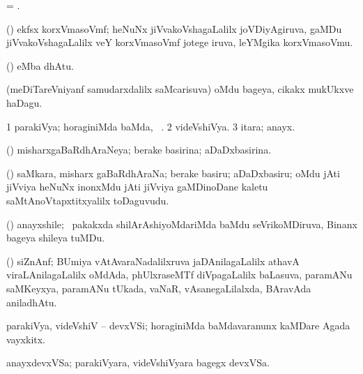 \bentry
{} 
\gl{\nA}
\bmng
= .
\emng
\eentry


\bentry
{} 
\gl{\nA} 
\bmng
(\jiVvi) ekfsx korxVmasoVmf; heNuNx jiVvakoVshagaLalilx joVDiyAgiruva, gaMDu jiVvakoVshagaLalilx veY  korxVmasoVmf jotege iruva, leYMgika korxVmasoVmu.
\emng  
\eentry

\bentry
{} 
\gl{\saMkiSx}
\bmng
{}
\emng
\eentry

\bentry
{}
\gl{\saMkeV}
\bmng
(\ravi)  eMba dhAtu.
\emng
\eentry

\bentry
{} 
\gl{\nA} 
\bmng
(meDiTareVniyanf samudarxdalilx saMcarisuva) oMdu bageya, cikakx mukUkxve haDagu. \quad {}
\emng
\eentry

\bentry
{} 
\gl{\sapUpa} 
\bmng
\bnum
\num{1} parakiVya; horaginiMda baMda, \udA\ .  
\num{2} videVshiVya. 
\num{3} itara; anayx.
\enum
\emng
\eentry

\bentry
{} 
\gl{\gu} 
\bmng
(\jiVvi) misharxgaBaRdhAraNeya; berake basirina; aDaDxbasirina.
\emng
\eentry

\bentry
{} 
\gl{\nA} 
\bmng
(\jiVvi) saMkara, misharx gaBaRdhAraNa; berake basiru; aDaDxbasiru; oMdu jAti jiVviya heNuNx inonxMdu jAti jiVviya gaMDinoDane kaletu saMtAnoVtapxtitxyalilx toDaguvudu.
\emng
\eentry

\bentry
{} 
\gl{\nA} 
\bmng
(\BUvi) anayxshile; \sA\ pakakxda shilArAshiyoMdariMda baMdu  seVrikoMDiruva, Binanx bageya shileya tuMDu.
\emng 
\eentry

\bentry
{} 
\gl{\nA}
\bmng
(\ravi) siZnAnf; BUmiya vAtAvaraNadalilxruva  jaDAnilagaLalilx athavA viraLAnilagaLalilx oMdAda, phUlxraseMTf  diVpagaLalilx baLasuva,  paramANu  saMKeyxya,  paramANu tUkada, vaNaR, vAsanegaLilalxda, BAravAda  aniladhAtu.
\emng  
\eentry

\bentry
{} 
\gl{\nA} 
\bmng
parakiVya, videVshiV -- devxVSi; horaginiMda  baMdavaranunx kaMDare Agada vayxkitx.
\emng  
\eentry

\bentry
{} 
\gl{\nA}
\bmng
anayxdevxVSa; parakiVyara, videVshiVyara bagegx devxVSa.
\emng
\eentry

